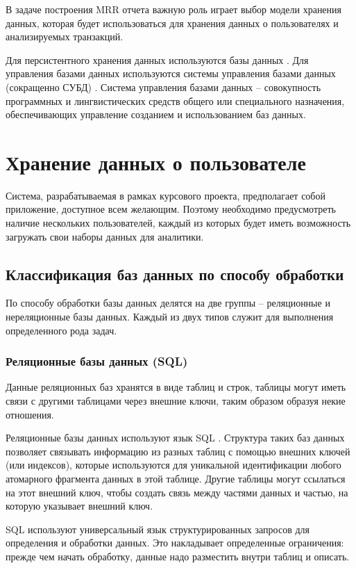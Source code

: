 В задаче построения MRR отчета важную роль играет выбор модели хранения данных, которая будет использоваться для хранения данных о пользователях и анализируемых транзакций.

Для персистентного хранения данных используются базы данных \cite{dbms}. Для управления базами данных используются системы управления базами данных (сокращенно СУБД) \cite{dbms}. Система управления базами данных -- совокупность программных и лингвистических средств общего или специального назначения, обеспечивающих управление созданием и использованием баз данных.

\section{Хранение данных о пользователе}

Система, разрабатываемая в рамках курсового проекта, предполагает собой приложение, доступное всем желающим. Поэтому необходимо предусмотреть наличие нескольких пользователей, каждый из которых будет иметь возможность загружать свои наборы данных для аналитики.

\subsection{Классификация баз данных по способу обработки}

По способу обработки базы данных делятся на две группы -- реляционные и нереляционные базы данных. Каждый из двух типов служит для выполнения определенного рода задач.

\subsubsection{Реляционные базы данных (SQL)}

Данные реляционных баз хранятся в виде таблиц и строк, таблицы могут иметь связи с другими таблицами через внешние ключи, таким образом образуя некие отношения.

Реляционные базы данных используют язык SQL \cite{sql}. Структура таких баз данных позволяет связывать информацию из разных таблиц с помощью внешних ключей (или индексов), которые используются для уникальной идентификации любого атомарного фрагмента данных в этой таблице. Другие таблицы могут ссылаться на этот внешний ключ, чтобы создать связь между частями данных и частью, на которую указывает внешний ключ.

SQL используют универсальный язык структурированных запросов для определения и обработки данных. Это накладывает определенные ограничения: прежде чем начать обработку, данные надо разместить внутри таблиц и описать.

